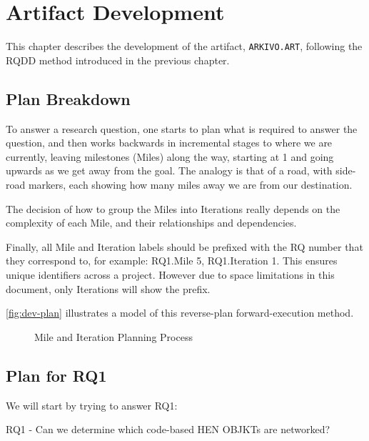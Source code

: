 \chapter{Artifact Development}
\label{chap:dev}

This chapter describes the development of the artifact, \texttt{ARKIVO.ART}, following the RQDD method introduced in the previous chapter.

\section{Plan Breakdown}

To answer a research question, one starts to plan what is required to answer the question, and then works backwards in incremental stages to where we are currently, leaving milestones (Miles) along the way, starting at 1 and going upwards as we get away from the goal. The analogy is that of a road, with side-road markers, each showing how many miles away we are from our destination.

The decision of how to group the Miles into Iterations really depends on the complexity of each Mile, and their relationships and dependencies.

Finally, all Mile and Iteration labels should be prefixed with the RQ number that they correspond to, for example: RQ1.Mile 5, RQ1.Iteration 1. This ensures unique identifiers across a project. However due to space limitations in this document, only Iterations will show the prefix.

\autoref{fig:dev-plan} illustrates a model of this reverse-plan forward-execution method.

\begin{figure}[h]
    \centering
    
    \caption[Mile and Iteration Planning Process]{Mile and Iteration Planning Process}
    \label{fig:dev-plan}
\end{figure}

\section{Plan for RQ1}

We will start by trying to answer RQ1:

\vspace{0.5cm}

RQ1 - Can we determine which code-based HEN OBJKTs are networked?

\vspace{0.5cm}

